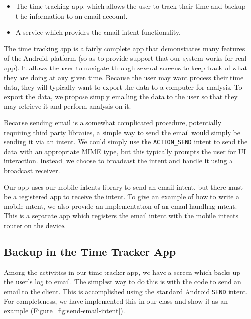 \documentclass{acm_proc_article-sp}
\begin{document}
\begin{itemize}
\item The time tracking app, which allows the user to track their time
  and backup t he information to an email account.
\item A service which provides the email intent functionality.
\end{itemize}

The time tracking app is a fairly complete app that demonstrates many
features of the Android platform (so as to provide support that our
system works for real app).  It allows the user to navigate through
several screens to keep track of what they are doing at any given
time.  Because the user may want process their time data, they will
typically want to export the data to a computer for analysis.  To
export the data, we propose simply emailing the data to the user so
that they may retrieve it and perform analysis on it.  

Because sending email is a somewhat complicated procedure, potentially
requiring third party libraries, a simple way to send the email would
simply be sending it via an intent.  We could simply use the
\texttt{ACTION\_SEND} intent to send the data with an appropriate MIME
type, but this typically prompts the user for UI interaction.
Instead, we choose to broadcast the intent and handle it using a
broadcast receiver.

Our app uses our mobile intents library to send an email intent, but
there must be a registered app to receive the intent.  To give an
example of how to write a mobile intent, we also provide an
implementation of an email handling intent.  This is a separate app
which registers the email intent with the mobile intents router on the
device.

\subsection{Backup in the Time Tracker App}

Among the activities in our time tracker app, we have a screen which
backs up the user's log to email.  The simplest way to do this is with
the code to send an email to the client.  This is accomplished using
the standard Android \texttt{SEND} intent.  For completeness, we have
implemented this in our class and show it as an example
(Figure~\ref{fig:send-email-intent}).
\end{document}
